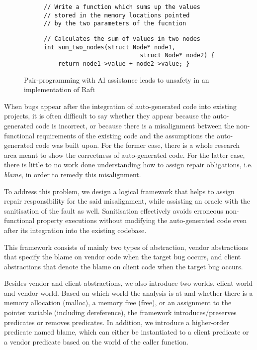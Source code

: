 \begin{itemize}
\begin{figure}[t]
{\begin{subfigure}{0.49\textwidth}
\begin{verbatim}
// Write a function which sums up the values
// stored in the memory locations pointed 
// by the two parameters of the fucntion
\end{verbatim}
\label{fig:exmem-leak}
  \end{subfigure}
}
{\footnotesize
\begin{subfigure}{0.49\textwidth}
\begin{verbatim}
// Calculates the sum of values in two nodes
int sum_two_nodes(struct Node* node1, 
                           struct Node* node2) {
    return node1->value + node2->value; }
\end{verbatim}
\label{fig:exmem-leak}
  \end{subfigure}
}
\caption{Pair-programming with AI assistance leads to unsafety in an implementation of Raft}
\end{figure}
\end{itemize}



When bugs appear after the integration of auto-generated code into existing projects, it is often difficult to say whether they appear because the auto-generated code is incorrect, or because there is a misalignment between the non-functional requirements of the existing code and the assumptions the auto-generated code was built upon. 
For the former case, there is a whole research area meant to show the correctness of auto-generated code. 
For the latter case, there is little to no work done understanding how to assign repair obligations, i.e. \emph{blame}, in order to remedy this misalignment. 

To address this problem, we design a logical framework that helps to assign repair responsibility for the said misalignment, while assisting an oracle with the sanitisation of the fault as well. Sanitisation effectively avoids erroneous non-functional property executions without modifying the auto-generated code even after its integration into the existing codebase.

This framework consists of mainly two types of abstraction, vendor abstractions that specify the blame on vendor code when the target bug occurs, and client abstractions that denote the blame on client code when the target bug occurs.

Besides vendor and client abstractions, we also introduce two worlds, client world and vendor world. Based on which world the analysis is at and whether there is a memory allocation (malloc), a memory free (free), or an assignment to the pointer variable (including dereference), the framework introduces/preserves predicates or removes predicates. In addition, we introduce a higher-order predicate named blame, which can either be instantiated to a client predicate or a vendor predicate based on the world of the caller function.

